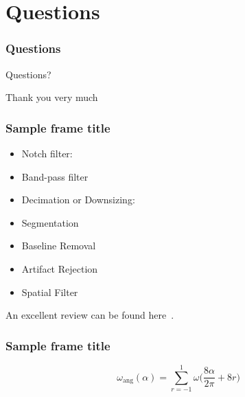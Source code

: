 \documentclass[aspectratio=169]{beamer}
\begin{document}
        \section{Questions}
    \begin{frame} %
        \frametitle{Questions}
        \begin{center}
        \LARGE Questions?
        \end{center}
    \end{frame}
    
    \begin{frame} %
        \begin{center}
        \LARGE Thank you very much
        \end{center}
    \end{frame}


\begin{frame}
\frametitle{Sample frame title}
\begin{itemize}
\item Notch filter:
\item Band-pass filter
\item Decimation or Downsizing:
\item Segmentation
\item Baseline Removal
\item Artifact Rejection
\item Spatial Filter
\end{itemize}
An excellent review can be found here~.
\end{frame}



\begin{frame}
\frametitle{Sample frame title}
\begin{equation}
 \omega_\mathrm{ang}(\alpha) = \sum_{r=-1}^{1} \omega \bigg ( \frac{8\alpha}{2\pi} + 8r \bigg )
\label{eq:wang}
\end{equation}
\end{frame}

% 
 
% 
% 
\end{document}
